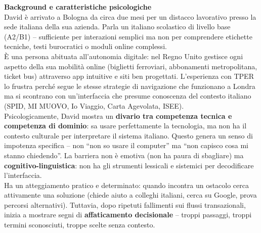\documentclass[11pt,a4paper]{article}
\begin{document}
\begin{tcolorbox}[colback=backgroundColor,colframe=borderColor,arc=2mm]
    \textbf{Background e caratteristiche psicologiche} \\[4pt]
    {\small
    David \`e arrivato a Bologna da circa due mesi per un distacco lavorativo presso la sede italiana della sua azienda. Parla un italiano scolastico di livello base (A2/B1) -- sufficiente per interazioni semplici ma non per comprendere etichette tecniche, testi burocratici o moduli online complessi. \\[4pt]

    \`E una persona abituata all'autonomia digitale: nel Regno Unito gestisce ogni aspetto della sua mobilit\`a online (biglietti ferroviari, abbonamenti metropolitana, ticket bus) attraverso app intuitive e siti ben progettati. L'esperienza con TPER lo frustra perch\'e segue le stesse strategie di navigazione che funzionano a Londra ma si scontrano con un'interfaccia che presume conoscenza del contesto italiano (SPID, MI MUOVO, Io Viaggio, Carta Agevolata, ISEE). \\[4pt]

    Psicologicamente, David mostra un \textbf{divario tra competenza tecnica e competenza di dominio}: sa usare perfettamente la tecnologia, ma non ha il contesto culturale per interpretare il sistema italiano. Questo genera un senso di impotenza specifica -- non ``non so usare il computer'' ma ``non capisco cosa mi stanno chiedendo''. La barriera non \`e emotiva (non ha paura di sbagliare) ma \textbf{cognitivo-linguistica}: non ha gli strumenti lessicali e sistemici per decodificare l'interfaccia. \\[4pt]

    Ha un atteggiamento pratico e determinato: quando incontra un ostacolo cerca attivamente una soluzione (chiede aiuto a colleghi italiani, cerca su Google, prova percorsi alternativi). Tuttavia, dopo ripetuti fallimenti sui flussi transazionali, inizia a mostrare segni di \textbf{affaticamento decisionale} -- troppi passaggi, troppi termini sconosciuti, troppe scelte senza contesto.
    }
\end{tcolorbox}

\vspace{0.3cm}

\end{document}
